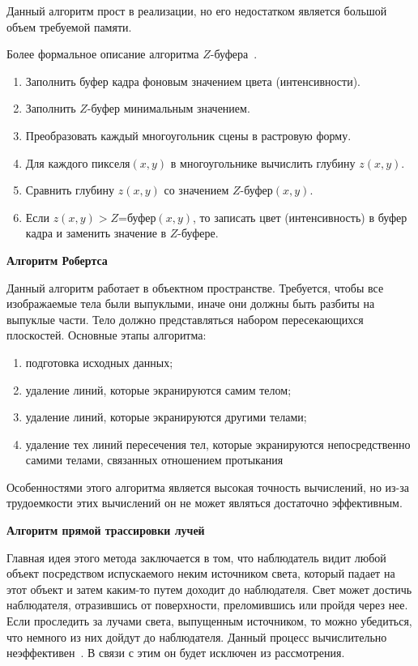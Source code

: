 Данный алгоритм прост в реализации, но его недостатком является большой объем требуемой памяти.

Более формальное описание алгоритма $Z$-буфера~\cite{rodgers}.
\begin{enumerate}
	\item Заполнить буфер кадра фоновым значением цвета (интенсивности).
	\item Заполнить $Z$-буфер минимальным значением.
	\item Преобразовать каждый многоугольник сцены в растровую форму.
	\item Для каждого пикселя$(x,y)$ в многоугольнике вычислить глубину $z(x,y)$.
	\item Сравнить глубину $z(x,y)$ со значением $Z$-буфер$(x,y)$.
	\item Если $z(x,y) > Z$=буфер$(x,y)$, то записать цвет (интенсивность) в буфер кадра и заменить значение в $Z$-буфере.
\end{enumerate}

\textbf{Алгоритм Робертса}

Данный алгоритм работает в объектном пространстве. Требуется, чтобы все изображаемые тела были выпуклыми, иначе они должны быть разбиты на выпуклые части. 
Тело должно представляться набором пересекающихся плоскостей. 
Основные этапы алгоритма:
\begin{enumerate}
	\item подготовка исходных данных;
	\item удаление линий, которые экранируются самим телом;
	\item удаление линий, которые экранируются другими телами;
	\item удаление тех линий пересечения тел, которые экранируются непосредственно самими телами, связанных отношением протыкания
\end{enumerate}

Особенностями этого алгоритма является высокая точность вычислений, но из-за трудоемкости этих вычислений он не может являться достаточно эффективным.

\textbf{Алгоритм прямой трассировки лучей}

Главная идея этого метода заключается в том, что наблюдатель видит любой объект посредством испускаемого неким источником света, который падает на этот объект и затем каким-то путем доходит до наблюдателя. Свет может достичь наблюдателя, отразившись от поверхности, преломившись или пройдя через нее. Если проследить за лучами света, выпущенным источником, то можно убедиться, что немного из них дойдут до наблюдателя. Данный процесс вычислительно неэффективен~\cite{rodgers}. В связи с этим он будет исключен из рассмотрения.

